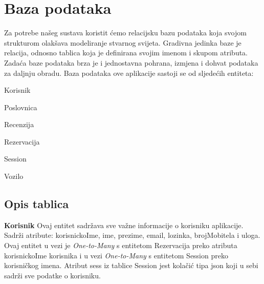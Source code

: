 	
		

		

				
		\section{Baza podataka}
			
			
		
		
		    \noindent Za potrebe našeg sustava koristit ćemo relacijsku bazu podataka koja
            svojom strukturom olakšava modeliranje stvarnog svijeta. Gradivna jedinka
            baze je relacija, odnosno tablica koja je definirana svojim imenom i 
            skupom atributa. Zadaća baze podataka brza je i jednostavna pohrana, 
            izmjena i dohvat podataka za daljnju obradu.
            Baza podataka ove aplikacije sastoji se od sljedećih entiteta:
            
            \begin{packed_item}
                \item Korisnik
                \item Poslovnica
                \item Recenzija
                \item Rezervacija
                \item Session
                \item Vozilo
            \end{packed_item}
		
			\subsection{Opis tablica}
			

				
				
				\noindent \textbf{Korisnik} \quad Ovaj entitet sadržava sve važne informacije o korisniku aplikacije. Sadrži atribute: korisnickoIme, ime, prezime, email, lozinka, brojMobitela i uloga. Ovaj entitet u vezi je
                \textit{One-to-Many} s entitetom Rezervacija preko atributa korisnickoIme korisnika i u vezi \textit{One-to-Many} s entitetom Session preko korisničkog imena. Atribut sess iz tablice Session jest kolačić tipa json koji u sebi sadrži sve podatke o korisniku. 
                
